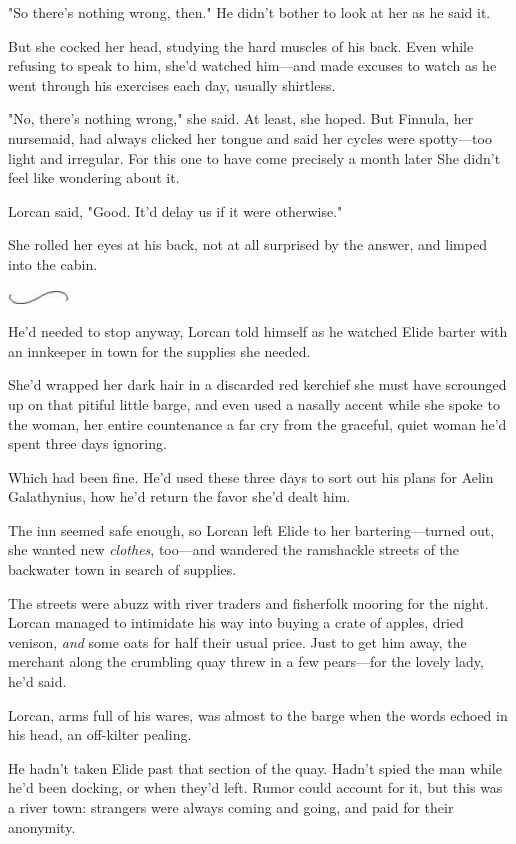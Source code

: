 "So  there's nothing wrong, then." He didn't bother to look at her as he said it.

But she cocked her head, studying the hard muscles of his back. Even while refusing to speak to him, she'd watched him---and made excuses to watch as he went through his exercises each day, usually shirtless.

"No, there's nothing wrong," she said. At least, she hoped. But Finnula, her nursemaid, had always clicked her tongue and said her cycles were spotty---too light and irregular. For this one to have come precisely a month later  She didn't feel like wondering about it.

Lorcan said, "Good. It'd delay us if it were otherwise."

She rolled her eyes at his back, not at all surprised by the answer, and limped into the cabin.

\includegraphics[width=0.65in,height=0.13in]{images/seperator}

He'd needed to stop anyway, Lorcan told himself as he watched Elide barter with an innkeeper in town for the supplies she needed.

She'd wrapped her dark hair in a discarded red kerchief she must have scrounged up on that pitiful little barge, and even used a nasally accent while she spoke to the woman, her entire countenance a far cry from the graceful, quiet woman he'd spent three days ignoring.

Which had been fine. He'd used these three days to sort out his plans for Aelin Galathynius, how he'd return the favor she'd dealt him.

The inn seemed safe enough, so Lorcan left Elide to her bartering---turned out, she wanted new \emph{clothes}, too---and wandered the ramshackle streets of the backwater town in search of supplies.

The streets were abuzz with river traders and fisherfolk mooring for the night. Lorcan managed to intimidate his way into buying a crate of apples, dried venison, \emph{and} some oats for half their usual price. Just to get him away, the merchant along the crumbling quay threw in a few pears---for the lovely lady, he'd said.

Lorcan, arms full of his wares, was almost to the barge when the words echoed in his head, an off-kilter pealing.

He hadn't taken Elide past that section of the quay. Hadn't spied the man while he'd been docking, or when they'd left. Rumor could account for it, but this was a river town: strangers were always coming and going, and paid for their anonymity.

